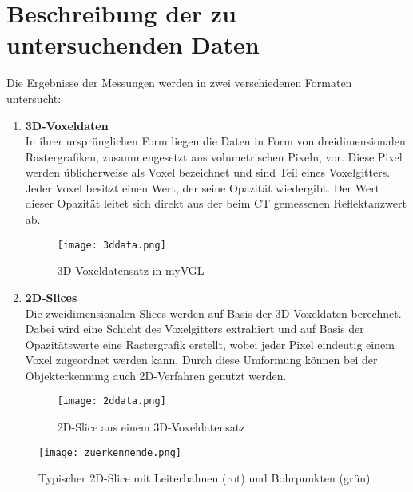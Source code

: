 
\chapter{Beschreibung der zu untersuchenden Daten}
Die Ergebnisse der Messungen werden in zwei verschiedenen Formaten untersucht:

\begin{enumerate}
\item \textbf{3D-Voxeldaten} \\
In ihrer ursprünglichen Form liegen die Daten in Form von dreidimensionalen Rastergrafiken, zusammengesetzt aus volumetrischen Pixeln, vor. Diese Pixel werden üblicherweise als Voxel bezeichnet und sind Teil eines Voxelgitters. Jeder Voxel besitzt einen Wert, der seine Opazität wiedergibt. Der Wert dieser Opazität leitet sich direkt aus der beim CT gemessenen Reflektanzwert ab.

\begin{figure}[H]
  \begin{center}
    \texttt{[image: 3ddata.png]}
    \caption{3D-Voxeldatensatz in myVGL}
    \label{fig:3ddata1}
  \end{center}
\end{figure}
\newpage
\item \textbf{2D-Slices} \\
Die zweidimensionalen Slices werden auf Basis der 3D-Voxeldaten berechnet. Dabei wird eine Schicht des Voxelgitters extrahiert und auf Basis der Opazitätswerte eine Rastergrafik erstellt, wobei jeder Pixel eindeutig einem Voxel zugeordnet werden kann. Durch diese Umformung können bei der Objekterkennung auch 2D-Verfahren genutzt werden.

\begin{figure}[H]
  \begin{center}
    \texttt{[image: 2ddata.png]}
    \caption{2D-Slice aus einem 3D-Voxeldatensatz}
    \label{fig:2ddata1}
  \end{center}
\end{figure}
\end{enumerate}

\begin{figure}[H]
  \begin{center}
    \texttt{[image: zuerkennende.png]}
    \caption{Typischer 2D-Slice mit Leiterbahnen (rot) und Bohrpunkten (grün)}
    \label{fig:zuerkennende1}
  \end{center}
\end{figure}

